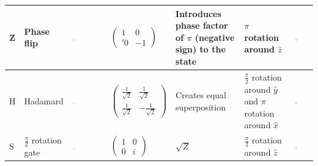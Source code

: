 \begin{table}[H]
\begin{tabular}{ C{0.3cm}  C{2cm}  C{1.5cm}  C{1.5cm} C{2.5cm} C{2cm} C{3.5cm}}
Z & Phase flip & \includegraphics[width=0.1\textwidth]{img/zcircuit.png} & $\begin{pmatrix}
 1 & 0 \\ '
 0 & -1
 \end{pmatrix}$ & Introduces phase factor of $\pi$ (negative sign) to the \1 state & $\pi$ rotation around $\hat{z}$ & \includegraphics[width=0.2\textwidth]{img/blochzgate.png} \\\midrule 
H & Hadamard & \includegraphics[width=0.1\textwidth]{img/hcircuit.png}  & $\begin{pmatrix}
 \frac{1}{\sqrt{2}} & \frac{1}{\sqrt{2}} \\ 
 \frac{1}{\sqrt{2}} & -\frac{1}{\sqrt{2}}
 \end{pmatrix}$ & Creates equal superposition & $\frac{\pi}{2}$ rotation around $\hat{y}$ and $\pi$ rotation around $\hat{x}$ & \includegraphics[width=0.2\textwidth]{img/blochhadamard.png}\\\midrule
S & $\frac{\pi}{2}$ rotation gate & \includegraphics[width=0.1\textwidth]{img/scircuit.png} & $\begin{pmatrix}
 1 & 0 \\ 
 0 & i
 \end{pmatrix}$ & $\sqrt{Z}$ & $\frac{\pi}{2}$ rotation around $\hat{z}$ &  \includegraphics[width=0.2\textwidth]{img/blochsgate.png}\\\midrule

\end{tabular}
\end{table}
